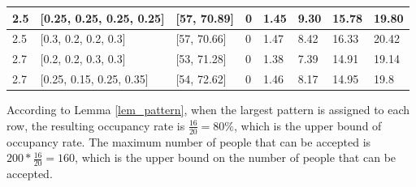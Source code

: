 \begin{table}[]
\begin{tabular}{llllllll}
  \hline           
  \multicolumn{1}{|l|}{2.5}  & \multicolumn{1}{l|}{[0.25, 0.25, 0.25, 0.25]} & \multicolumn{1}{l|}{[57, 70.89]}  & \multicolumn{1}{l|}{0}  & \multicolumn{1}{l|}{1.45}  & \multicolumn{1}{l|}{9.30} & \multicolumn{1}{l|}{15.78} & \multicolumn{1}{l|}{19.80} \\ 
  \hline
  \multicolumn{1}{|l|}{2.5}  & \multicolumn{1}{l|}{[0.3, 0.2, 0.2, 0.3]} & \multicolumn{1}{l|}{[57, 70.66]}  & \multicolumn{1}{l|}{0}  & \multicolumn{1}{l|}{1.47}  & \multicolumn{1}{l|}{8.42} & \multicolumn{1}{l|}{16.33} & \multicolumn{1}{l|}{20.42} \\ 
  \hline          
  \multicolumn{1}{|l|}{2.7}  & \multicolumn{1}{l|}{[0.2, 0.2, 0.3, 0.3]} & \multicolumn{1}{l|}{[53, 71.28]}  & \multicolumn{1}{l|}{0}  & \multicolumn{1}{l|}{1.38}  & \multicolumn{1}{l|}{7.39} & \multicolumn{1}{l|}{14.91} & \multicolumn{1}{l|}{19.14} \\ 
  \hline
  \multicolumn{1}{|l|}{2.7}  & \multicolumn{1}{l|}{[0.25, 0.15, 0.25, 0.35]} & \multicolumn{1}{l|}{[54, 72.62]}  & \multicolumn{1}{l|}{0}  & \multicolumn{1}{l|}{1.46}  & \multicolumn{1}{l|}{8.17} & \multicolumn{1}{l|}{14.95} & \multicolumn{1}{l|}{19.8} \\ 
  \hline
\end{tabular}
\end{table}

According to Lemma \ref{lem_pattern}, when the largest pattern is assigned to each row, the resulting occupancy rate is $\frac{16}{20} = 80\%$, which is the upper bound of occupancy rate. The maximum number of people that can be accepted is $200 * \frac{16}{20} = 160$, which is the upper bound on the number of people that can be accepted.




